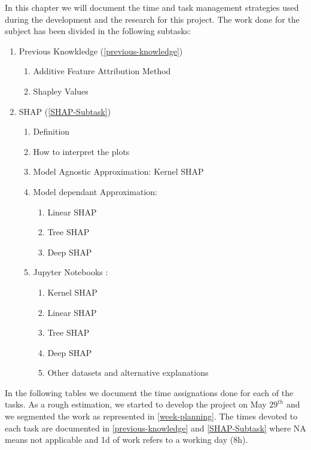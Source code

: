 In this chapter we will document the time and task management strategies used during the development and the research for this project. The work done for the subject has been divided in the following subtasks:

\begin{enumerate}
    \item Previous Knowkledge (\autoref{previous-knowledge})
            \begin{enumerate}
                \item Additive Feature Attribution Method
                \item Shapley Values
            \end{enumerate}
    \item SHAP (\autoref{SHAP-Subtask})
            \begin{enumerate}
                \item Definition
                \item How to interpret the plots 
                \item Model Agnostic Approximation: Kernel SHAP
                \item Model dependant Approximation: 
                    \begin{enumerate}
                        \item Linear SHAP
                        \item Tree SHAP
                        \item Deep SHAP
                    \end{enumerate}
                \item Jupyter Notebooks \cite{ExampleNotebooks}:
                    \begin{enumerate}
                        \item Kernel SHAP
                        \item Linear SHAP
                        \item Tree SHAP
                        \item Deep SHAP
                        \item Other datasets and alternative explanations
                    \end{enumerate}
            \end{enumerate}
\end{enumerate}

In the following tables we document the time assignations done for each of the tasks. As a rough estimation, we started to develop the project on May $29^{th}$ and we segmented the work as represented in \autoref{week-planning}. The times devoted to each task are documented in \autoref{previous-knowledge} and \autoref{SHAP-Subtask} where NA means not applicable and 1d of work refers to a working day (8h).

